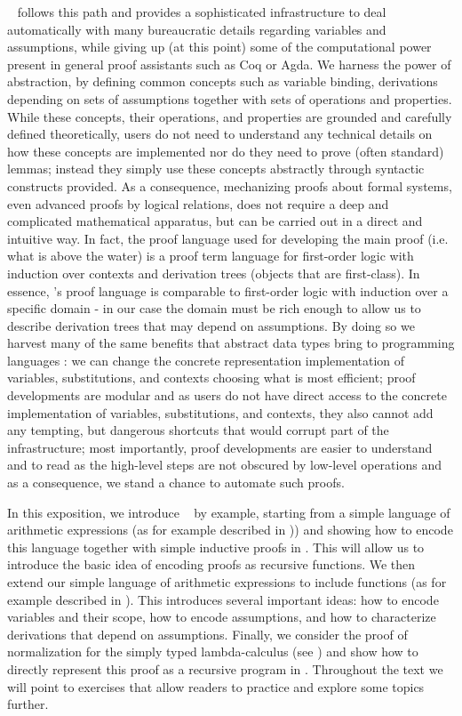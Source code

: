 \beluga~\citep{Pientka:IJCAR10,Pientka:CADE15} follows this path and provides a sophisticated infrastructure to deal automatically with many bureaucratic details regarding variables and  assumptions, while giving up  (at this point) some of the computational power present in general proof assistants such as Coq or Agda.  We harness the power of abstraction, by defining common concepts such as variable binding, derivations depending on sets of assumptions together with sets of operations and properties. While these concepts, their operations, and properties are grounded and carefully defined theoretically, users do not need to understand any technical details on how these concepts are implemented nor do they need to prove (often standard) lemmas;  instead they simply use these concepts abstractly through syntactic constructs provided. As a consequence, mechanizing proofs about formal systems, even advanced proofs by logical relations, does not require a deep and complicated mathematical apparatus, but can be carried out in a direct and intuitive way.  In fact, the proof language used for developing the main proof (i.e. what is above the water) is a proof term language for first-order logic with induction over contexts and derivation trees (objects that are first-class). In essence, \beluga's proof language is comparable to first-order logic with induction over a specific domain - in our case the domain must be rich enough to allow us to describe derivation trees that may depend on assumptions. By doing so we harvest many of the same benefits that abstract data types bring to programming languages \citep{Liskov:74}: we can change the concrete representation implementation of variables, substitutions, and contexts choosing what is most efficient;  proof developments are modular and as users do not have direct access to the concrete implementation of variables, substitutions, and contexts, they also cannot add any tempting, but dangerous shortcuts that would corrupt part of the infrastructure; most importantly, proof developments are easier to understand and to read as the high-level steps are not obscured by low-level operations and as a consequence, we stand a chance to automate such proofs.

In this exposition, we introduce \beluga~ by example, starting from a simple language of arithmetic expressions (as for example described in \cite[Ch 3, Ch 8]{TAPL})) and showing how to encode this language together with simple inductive proofs  in \beluga. This will allow us to introduce the basic idea of encoding proofs as recursive functions. We then extend our simple language of arithmetic expressions to include functions (as for example described in \cite[Ch 5, Ch 9]{TAPL}). This introduces several important ideas: how to encode variables and their scope, how to encode assumptions, and how to characterize derivations that depend on assumptions. Finally, we consider the proof of normalization for the simply typed lambda-calculus (see \cite[Ch 12]{TAPL}) and show how to directly represent this proof as a recursive program in \beluga. Throughout the text we will point to exercises that allow readers to practice and explore some topics further.

